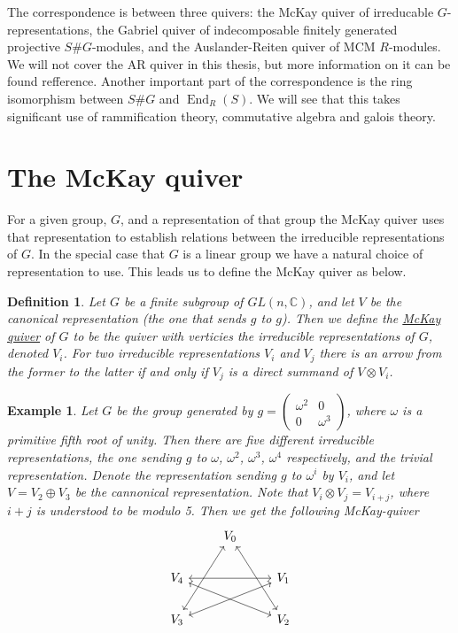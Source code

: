 \documentclass[11pt, a4paper, english]{article}
\numberwithin{prop}{section}
\numberwithin{lemma}{section}
\numberwithin{theorem}{section}
\newtheorem{defin}{Definition}
\numberwithin{defin}{section}
\newtheorem{example}{Example}
\numberwithin{example}{section}
\newcommand{\C}{\mathbb{C}}
\DeclareMathOperator{\End}{End}
\begin{document}
The correspondence is between three quivers: the McKay quiver of irreducable $G$-representations, the Gabriel quiver of indecomposable finitely generated projective $S\#G$-modules, and the Auslander-Reiten quiver of MCM $R$-modules. We will not cover the AR quiver in this thesis, but more information on it can be found {\color{red} refference}. Another important part of the correspondence is the ring isomorphism between $S\#G$ and $\End_R(S)$. We will see that this takes significant use of rammification theory, commutative algebra and galois theory.

\section{The McKay quiver}
For a given group, $G$, and a representation of that group the McKay quiver uses that representation to establish relations between the irreducible representations of $G$. In the special case that $G$ is a linear group we have a natural choice of representation to use. This leads us to define the McKay quiver as below.
\begin{defin}
Let $G$ be a finite subgroup of $GL(n, \C)$, and let $V$ be the canonical representation (the one that sends $g$ to $g$). Then we define the \underline{McKay quiver} of $G$ to be the quiver with verticies the irreducible representations of $G$, denoted $V_i$. For two irreducible representations $V_i$ and $V_j$ there is an arrow from the former to the latter if and only if $V_j$ is a direct summand of $V \otimes V_i$. 
\end{defin}

\begin{example}
Let $G$ be the group generated by $g =\begin{pmatrix}
\omega^2 & 0\\
0 & \omega^{3}
\end{pmatrix}$, where $\omega$ is a primitive fifth root of unity. Then there are five different irreducible representations, the one sending $g$ to $\omega$, $\omega^2$, $\omega^3$, $\omega^4$ respectively, and the trivial representation. Denote the representation sending $g$ to $\omega^i$ by $V_i$, and let $V = V_2 \oplus V_3$ be the cannonical representation. Note that $V_i \otimes V_j = V_{i+j}$, where $i+j$ is understood to be modulo 5. Then we get the following McKay-quiver
$$
\begin{tikzcd}
& V_0 \arrow[<->]{ddr} \arrow[<->]{ddl} & \\
V_4 && V_1 \arrow[<->]{ll}\arrow[<->]{dll}\\
V_3 && V_2 \arrow[<->]{ull}
\end{tikzcd}  
$$
\end{example}
\end{document}
